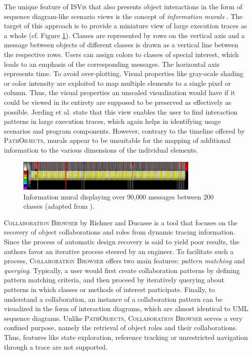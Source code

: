 The unique feature of \textsc{ISVis} \cite{jerding_using_1997} that also presents object interactions in the form of sequence diagram-like scenario views is the concept of \emph{ information murals} \cite{jerding_information_1998, jerding_visualizing_1996}.
The target of this approach is to provide a miniature view of large execution traces as a whole (cf. Figure \ref{fig:NotationMural}).
Classes are represented by rows on the vertical axis and a message between objects of different classes is drawn as a vertical line between the respective rows.
Users can assign colors to classes of special interest, which leads to an emphasis of the corresponding messages.
The horizontal axis represents time.
To avoid over-plotting, Visual properties like gray-scale shading or color intensity are exploited to map multiple elements to a single pixel or column.
Thus, the visual properties an unscaled visualization would have if it could be viewed in its entirety are supposed to be preserved as effectively as possible.
Jerding et al. state that this view enables the user to find interaction patterns in large execution traces, which again helps in identifying usage scenarios and program components.
However, contrary to the timeline offered by \textsc{PathObjects}, murals appear to be unsuitable for the mapping of additional information to the various dimensions of the individual elements.

\begin{figure}[tb]
	\centering
	\includegraphics[width=0.8\textwidth]{../images/06-Mural}
	\caption[Information Mural by Jerding et al.]{Information mural displaying over 90,000 messages between 200 classes (adapted from \cite{jerding_information_1998}).}
	\label{fig:NotationMural}
\end{figure}

\textsc{Collaboration Browser} by Richner and Ducasse \cite{richner_using_2002} is a tool that focuses on the recovery of object collaborations and roles from dynamic tracing information.
Since the process of automatic design recovery is said to yield poor results, the authors favor an iterative process steered by an engineer.
To facilitate such a process, \textsc{Collaboration Browser} offers two main features: \emph{pattern matching} and \emph{querying}. 
Typically, a user would first create collaboration patterns by defining pattern matching criteria, and then proceed by iteratively querying about patterns in which classes or methods of interest participate.
Finally, to understand a collaboration, an instance of a collaboration pattern can be visualized in the form of interaction diagrams, which are almost identical to UML sequence diagrams.
Unlike \textsc{PathObjects}, \textsc{Collaboration Browser} serves a very confined purpose, namely the retrieval of object roles and their collaborations.
Thus, features like state exploration, reference tracking or unrestricted navigation through a trace are not supported.

